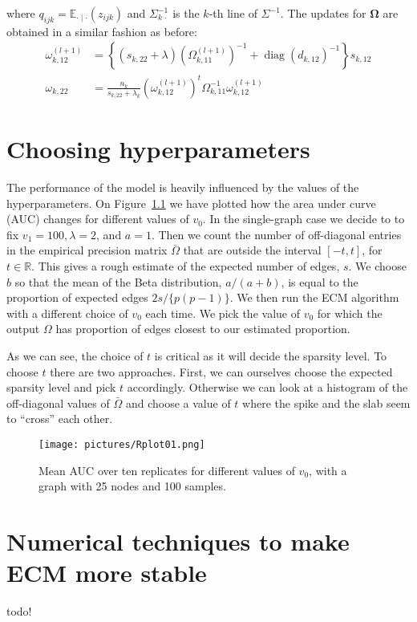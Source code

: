 \documentclass[a4paper, 11pt, oneside]{report}
\DeclareMathOperator{\diag}{diag}
\newcommand{\R}{\mathbb{R}}
\newcommand{\E}{\mathbb{E}}
\newcommand{\1}{\mathds{1}}
\newcommand{\inv}{^{-1}}
\newcommand{\bOmega}{\mathbf{\Omega}}
\begin{document}
where $q_{ijk} = \E_{\cdot \mid \cdot}(z_{ijk})$ and $\Sigma_{k \, \cdot}\inv$ is
the $k$-th line of $\Sigma\inv$.
The updates for $\bOmega$ are obtained in a similar fashion as before:
\begin{align*}
	\omega_{k,12}^{(l+1)} & = \left\{(s_{k, 22} + \lambda) \left(\Omega_{k, 11}^{(l+1)}\right)\inv + \diag(d_{k, 12})\inv\right\} s_{k, 12}   \\
	\omega_{k, 22}        & = \frac{n_k}{s_{k,22} + \lambda_k} \left(\omega_{k,12}^{(l+1)}\right)^t \Omega_{k, 11}\inv \omega_{k, 12}^{(l+1)}
\end{align*}

\chapter{Choosing hyperparameters}
The performance of the model is heavily influenced by the values of the
hyperparameters. On Figure~\ref{fig:mean_auc} we have plotted how the area
under curve (AUC) changes for different values of $v_0$. In the single-graph
case we decide to to fix $v_1 = 100,
	\lambda = 2$, and $a = 1$. Then we count the number of off-diagonal entries in
the empirical precision matrix $\bar \Omega$ that are outside the interval
$[-t, t]$, for $t \in \R$. This gives a rough estimate of the expected number
of edges, $s$. We choose $b$ so that the mean of the Beta distribution,
$a/(a+b)$, is equal to the proportion of expected edges $2s/\{p(p-1)\}$. We then
run the ECM algorithm with a different choice of $v_0$ each time. We pick the
value of $v_0$ for which the output $\Omega$ has proportion of edges closest to
our estimated proportion.

As we can see, the choice of $t$ is critical as it will decide the sparsity level.
To choose $t$ there are two approaches. First, we can ourselves choose the
expected sparsity level and pick $t$ accordingly. Otherwise we can look at a
histogram of the off-diagonal values of $\bar \Omega$ and choose a value of $t$
where the spike and the slab seem to ``cross'' each other.

\begin{figure}
	\centering
	\texttt{[image: pictures/Rplot01.png]}
	\caption{Mean AUC over ten replicates for different values of $v_0$, with a
		graph with 25 nodes and 100 samples.}\label{fig:mean_auc}
\end{figure}

\chapter{Numerical techniques to make ECM more stable}
todo!
\end{document}
